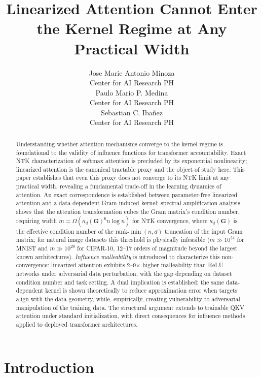 \documentclass{article}
\title{Linearized Attention Cannot Enter the Kernel Regime at Any Practical Width}
\author{%
  Jose Marie Antonio Minoza \\
  Center for AI Research PH \\
  \And
  Paulo Mario P. Medina \\
  Center for AI Research PH \\
  \And
  Sebastian C. Iba\~{n}ez \\
  Center for AI Research PH \\
}
\theoremstyle{plain}
\theoremstyle{definition}
\theoremstyle{remark}
\begin{document}
\maketitle

\begin{abstract}
Understanding whether attention mechanisms converge to the kernel regime is foundational to the validity of influence functions for transformer accountability. Exact NTK characterization of softmax attention is precluded by its exponential nonlinearity; linearized attention is the canonical tractable proxy and the object of study here. This paper establishes that even this proxy does not converge to its NTK limit at any practical width, revealing a fundamental trade-off in the learning dynamics of attention. An exact correspondence is established between parameter-free linearized attention and a data-dependent Gram-induced kernel; spectral amplification analysis shows that the attention transformation cubes the Gram matrix's condition number, requiring width $m = \Omega(\kappa_d(\mathbf{G})^6 n\log n)$ for NTK convergence, where $\kappa_d(\mathbf{G})$ is the effective condition number of the rank-$\min(n,d)$ truncation of the input Gram matrix; for natural image datasets this threshold is physically infeasible ($m \gg 10^{24}$ for MNIST and $m \gg 10^{29}$ for CIFAR-10, 12--17 orders of magnitude beyond the largest known architectures). \emph{Influence malleability} is introduced to characterize this non-convergence: linearized attention exhibits 2--9$\times$ higher malleability than ReLU networks under adversarial data perturbation, with the gap depending on dataset condition number and task setting. A dual implication is established: the same data-dependent kernel is shown theoretically to reduce approximation error when targets align with the data geometry, while, empirically, creating vulnerability to adversarial manipulation of the training data. The structural argument extends to trainable QKV attention under standard initialization, with direct consequences for influence methods applied to deployed transformer architectures.
\end{abstract}

\section{Introduction}
\label{sec:intro}
\end{document}
